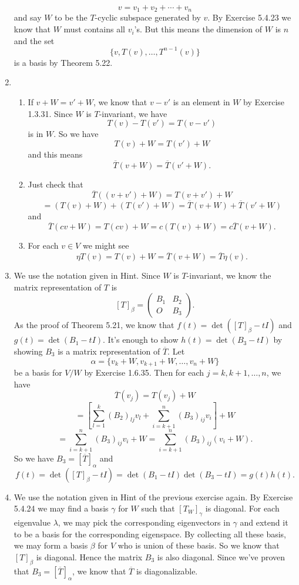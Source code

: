 \begin{enumerate}
\[v=v_1+v_2+\cdots +v_n\]
and say $W$ to be the $T$-cyclic subspace generated by $v$. By Exercise 5.4.23 we know that $W$ must contains all $v_i$'s. But this means the dimension of $W$ is $n$ and the set 
\[\{v,T(v),\ldots ,T^{n-1}(v)\}\]
is a basis by Theorem 5.22.
\item \begin{enumerate}
\item If $v+W=v'+W$, we know that $v-v'$ is an element in $W$ by Exercise 1.3.31. Since $W$ is $T$-invariant, we have 
\[T(v)-T(v')=T(v-v')\]
is in $W$. So we have 
\[T(v)+W=T(v')+W\]
and this means
\[\overline{T}(v+W)=\overline{T}(v'+W).\]
\item Just check that 
\[\overline{T}((v+v')+W)=T(v+v')+W\]
\[=(T(v)+W)+(T(v')+W)=\overline{T}(v+W)+\overline{T}(v'+W)\]
and 
\[\overline{T}(cv+W)=T(cv)+W=c(T(v)+W)=c\overline{T}(v+W).\]
\item For each $v\in V$ we might see
\[\eta T(v)=T(v)+W=\overline{T}(v+W)=\overline{T}\eta(v).\]
\end{enumerate}
\item We use the notation given in Hint. Since $W$ is $T$-invariant, we know the matrix representation of $T$ is 
\[[T]_{\beta}=\begin{pmatrix}B_1&B_2\\O&B_3\end{pmatrix}.\]
As the proof of Theorem 5.21, we know that $f(t)=\det([T]_{\beta}-tI)$ and $g(t)=\det(B_1-tI)$. It's enough to show $h(t)=\det(B_3-tI)$ by showing $B_3$ is a matrix representation of $\overline{T}$. Let 
\[\alpha=\{v_k+W,v_{k+1}+W,\ldots ,v_n+W\}\]
be a basis for $V/W$ by Exercise 1.6.35. Then for each $j=k,k+1,\ldots ,n$, we have 
\[\overline{T}(v_j)=T(v_j)+W\]
\[=[\sum_{l=1}^k{(B_2)_{lj}v_l}+\sum_{i=k+1}^n{(B_3)_{ij}v_i}]+W\]
\[=\sum_{i=k+1}^n{(B_3)_{ij}v_i}+W=\sum_{i=k+1}^n{(B_3)_{ij}(v_i+W)}.\]
So we have $B_3=[\overline{T}]_{\alpha}$ and 
\[f(t)=\det([T]_{\beta}-tI)=\det(B_1-tI)\det(B_3-tI)=g(t)h(t).\]
\item We use the notation given in Hint of the previous exercise again. By Exercise 5.4.24 we may find a basis $\gamma$ for $W$ such that $[T_W]_{\gamma}$ is diagonal. For each eigenvalue $\lambda$, we may pick the corresponding eigenvectors in $\gamma$ and extend it to be a basis for the corresponding eigenspace. By collecting all these basis, we may form a basis $\beta$ for $V$ who is union of these basis. So we know that $[T]_{\beta}$ is diagonal. Hence the matrix $B_3$ is also diagonal. Since we've proven that $B_3=[\overline{T}]_{\alpha}$, we know that $\overline{T}$ is diagonalizable.

\end{enumerate}
